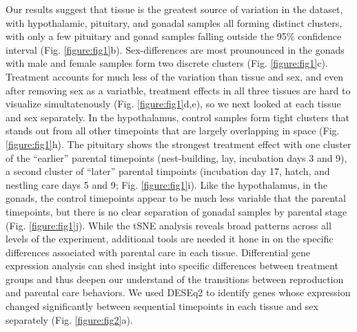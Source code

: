 Our results suggest that tissue is the greatest source of variation in
the dataset, with hypothalamic, pituitary, and gonadal samples all
forming distinct clusters, with only a few pituitary and gonad samples
falling outside the 95\% confidence interval (Fig. \ref{figure:fig1}b).
Sex-differences are most prounounced in the gonads with male and female
samples form two discrete clusters (Fig. \ref{figure:fig1}c). Treatment
accounts for much less of the variation than tissue and sex, and even
after removing sex as a variatble, treatment effects in all three
tissues are hard to visualize simultatenously (Fig.
\ref{figure:fig1}d,e), so we next looked at each tissue and sex
separately. In the hypothalamus, control samples form tight clusters
that stands out from all other timepoints that are largely overlapping
in space (Fig. \ref{figure:fig1}h). The pituitary shows the strongest
treatment effect with one cluster of the ``earlier'' parental timepoints
(nest-building, lay, incubation days 3 and 9), a second cluster of
``later'' parental timpoints (incubation day 17, hatch, and nestling
care days 5 and 9; Fig. \ref{figure:fig1}i). Like the hypothalamus, in
the gonads, the control timepoints appear to be much less variable that
the parental timepoints, but there is no clear separation of gonadal
samples by parental stage (Fig. \ref{figure:fig1}j). While the tSNE
analysis reveals broad patterns across all levels of the experiment,
additional tools are needed it hone in on the specific differences
associated with parental care in each tissue. Differential gene
expression analysis can shed insight into specific differences between
treatment groups and thus deepen our understand of the transitions
between reproduction and parental care behaviors. We used DESEq2 to
identify genes whose expression changed significantly between sequential
timepoints in each tissue and sex separately (Fig. \ref{figure:fig2}a).

